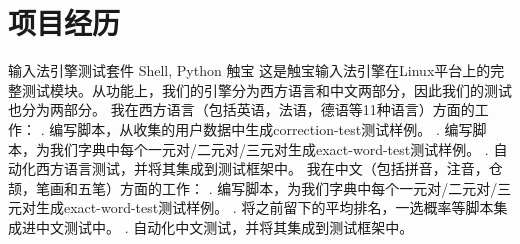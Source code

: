 \documentclass[11pt,a4paper]{moderncv}
\begin{document}
\section{项目经历}
{输入法引擎测试套件}
{Shell, Python}{}
{触宝}
{
这是触宝输入法引擎在Linux平台上的完整测试模块。从功能上，我们的引擎分为西方语言和中文两部分，因此我们的测试也分为两部分。
\newline 我在西方语言（包括英语，法语，德语等11种语言）方面的工作：
. 编写脚本，从收集的用户数据中生成correction-test测试样例。
. 编写脚本，为我们字典中每个一元对/二元对/三元对生成exact-word-test测试样例。
. 自动化西方语言测试，并将其集成到测试框架中。
\newline
\newline 我在中文（包括拼音，注音，仓颉，笔画和五笔）方面的工作：
. 编写脚本，为我们字典中每个一元对/二元对/三元对生成exact-word-test测试样例。
. 将之前留下的平均排名，一选概率等脚本集成进中文测试中。
. 自动化中文测试，并将其集成到测试框架中。
\newline
}
\end{document}
